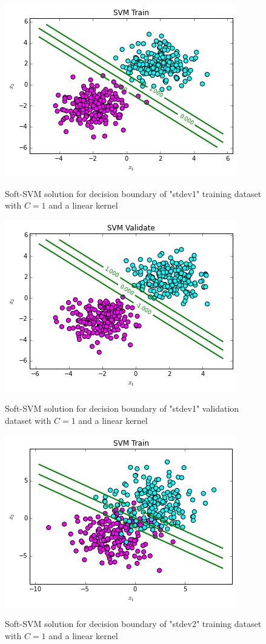 \documentclass[10pt]{article}
\begin{document}
\begin{figure}
\centering
\includegraphics[scale=0.5]{svm_stdev1_train.png}
\label{svm_toy}
\caption{Soft-SVM solution for decision boundary of "stdev1" training dataset with $C=1$ and a linear kernel}
\end{figure}
\begin{figure}
\centering
\includegraphics[scale=0.5]{svm_stdev1_val.png}
\label{svm_toy}
\caption{Soft-SVM solution for decision boundary of "stdev1" validation dataset with $C=1$ and a linear kernel}
\end{figure}
\begin{figure}
\centering
\includegraphics[scale=0.5]{svm_stdev2_train.png}
\label{svm_toy}
\caption{Soft-SVM solution for decision boundary of "stdev2" training dataset with $C=1$ and a linear kernel}
\end{figure}
\end{document}
